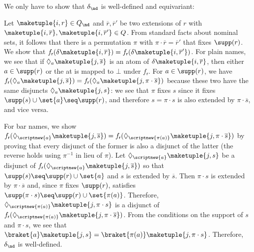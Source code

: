 \documentclass[10pt, final, conference, a4paper, twocolumn]{IEEEtran}
\begin{document}
\begin{IEEEproof}
  We only have to show that $\delta_{\nd}$ is well-defined and equivariant:

  Let $\maketuple{i, r} \in Q_{\nd}$ and $\overline{r}, \overline{r}'$ be two extensions of $r$ with
  $\maketuple{i, \overline{r}}, \maketuple{i, \overline{r}'} \in Q$. From standard facts about nominal
  sets, it follows that there is a permutation $\pi$ with $\pi\cdot \overline{r} = \overline{r}'$
  that fixes $\supp(r)$. We show that $f_{\mathsf{r}}(\delta\maketuple{i,\overline{r}}) = f_{\mathsf{r}}(\delta\maketuple{i,\overline{r}'})$.
  For plain names, we see that if $\Diamond_a \maketuple{j,\overline{s}}$ is an atom of $\delta\maketuple{i, \overline{r}}$,
  then either $a \in \supp(r)$ or the at is mapped to $\bot$ under $f_{\mathsf{r}}$.
  For $a \in \supp(r)$, we have $f_{\mathsf{r}}(\Diamond_a \maketuple{j,\overline{s}}) = f_{\mathsf{r}}(\Diamond_a \maketuple{j,\pi\cdot\overline{s}})$
  because these two have the same disjuncts $\Diamond_a\maketuple{j,s}$: we see that $\pi$ fixes $s$ since it fixes
  $\supp(s) \cup \set{a} \seq \supp(r)$, and therefore $s = \pi\cdot s$ is also extended by $\pi\cdot\overline s$, and vice versa.

  For bar names, we show $f_{\mathsf{r}}(\Diamond_{\scriptnew{a}} \maketuple{j,\overline{s}}) = f_{\mathsf{r}}(\Diamond_{\scriptnew{\pi(a)}} \maketuple{j,\pi\cdot\overline{s}})$
  by proving that every disjunct of the former is also a disjunct of the latter (the reverse holds using $\pi^{-1}$ in lieu of $\pi$).
  Let $\Diamond_{\scriptnew{a}} \maketuple{j, s}$ be a disjunct of $f_{\mathsf{r}}(\Diamond_{\scriptnew{a}} \maketuple{j,\overline{s}})$
  so that $\supp(s) \seq \supp(r) \cup \set{a}$ and $s$ is extended by $\overline{s}$. Then $\pi\cdot s$ is extended by
  $\pi\cdot\overline{s}$ and, since $\pi$ fixes $\supp(r)$, satisfies $\supp(\pi\cdot s) \seq \supp(r) \cup \set{\pi(a)}$.
  Therefore, $\Diamond_{\scriptnew{\pi(a)}} \maketuple{j, \pi\cdot s}$ is a disjunct of $f_{\mathsf{r}}(\Diamond_{\scriptnew{\pi(a)}}
  \maketuple{j,\pi\cdot\overline{s}})$.
  From the conditions on the support of $s$ and $\pi\cdot s$, we see that $\braket{a}\maketuple{j, s} = \braket{\pi(a)}\maketuple{j, \pi\cdot s}$.
  Therefore, $\delta_{\nd}$ is well-defined.


\end{IEEEproof}
\end{document}
